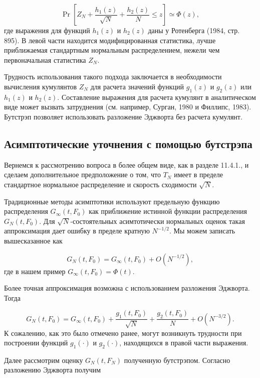 \begin{equation}
\Pr \left[ Z_N+\dfrac{h_1(z)}{\sqrt{N}}+\dfrac{h_2(z)}{N} \leq z \right] \simeq \Phi(z),
\end{equation}
где выражения для функций $h_1(z)$ и $h_2(z)$ даны у Ротенберга (1984, стр. 895). В левой части находится модифицированная статистика, лучше приближаемая стандартным нормальным распределением, нежели чем  первоначальная статистика $Z_N$.

Трудность использования такого подхода заключается в необходимости вычисления кумулянтов $Z_N$ для расчета значений функций $g_1(z)$ и $g_2(z)$ или $h_1(z)$ и $h_2(z)$. Составление выражения для расчета кумулянт в аналитическом виде может вызвать затруднения (см. например, Сурган, 1980 и Филлипс, 1983). Бутстрэп позволяет использовать разложение Эджворта без расчета кумулянт.

\subsection{Асимптотические уточнения с помощью бутстрэпа}

Вернемся к рассмотрению  вопроса в более общем виде, как в разделе 11.4.1., и сделаем дополнительное предположение о том, что $T_N$  имеет в пределе стандартное нормальное распределение и скорость сходимости $\sqrt{N}$.

Традиционные методы асимптотики используют предельную  функцию распределения $G_{\infty}(t,F_0)$ как приближение истинной функции распределения $G_N(t,F_0)$. Для $\sqrt{N}$-состоятельных асимтотически нормальных оценок такая аппроксимация дает ошибку в пределе кратную $N^{-1/2}$. Мы можем записать вышесказанное как

\begin{equation}
G_N(t,F_0)=G_{\infty}(t,F_0)+O(N^{-1/2}),
\end{equation}
где в нашем пример $G_{\infty}(t,F_0)=\Phi(t)$.

Более точная аппроксимация возможна с использованием разложения Эджворта. Тогда

\begin{equation}
G_N(t,F_0)=G_{\infty}(t,F_0)+\dfrac{g_1(t,F_0)}{\sqrt{N}}+\dfrac{g_2(t,F_0)}{N}+O(N^{-3/2}).
\end{equation}
К сожалению, как это было отмечено ранее, могут возникнуть трудности при построении функций $g_1(\cdot)$ и $g_2(\cdot)$, находящихся в правой части выражения.

Далее рассмотрим оценку $G_N(t,F_N)$ полученную бутстрэпом. Согласно разложению Эджворта получим 

